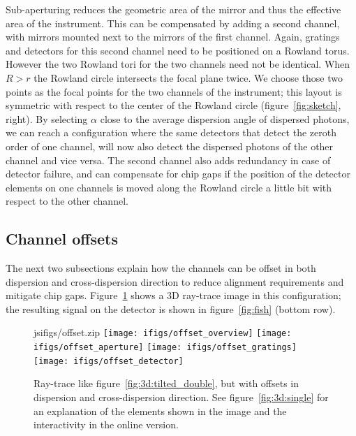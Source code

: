 \documentclass[linenumbers]{aastex631}
\begin{document}
Sub-aperturing reduces the geometric area of the mirror and thus the effective area of the instrument. This can be compensated by adding a second channel, with mirrors mounted next to the mirrors of the first channel. Again, gratings and detectors for this second channel need to be positioned on a Rowland torus. However the two Rowland tori for the two channels need not be identical. When $R> r$ the Rowland circle intersects the focal plane twice. We choose those two points as the focal points for the two channels of the instrument; this layout is symmetric with respect to the center of the Rowland circle (figure~\ref{fig:sketch}, right). By selecting $\alpha$ close to the average dispersion angle of dispersed photons, we can reach a configuration where the same detectors that detect the zeroth order of one channel, will now also detect the dispersed photons of the other channel and vice versa. The second channel also adds redundancy in case of detector failure, and can compensate for chip gaps if the position of the detector elements on one channels is moved along the Rowland circle a little bit with respect to the other channel. %

\subsection{Channel offsets}
The next two subsections explain how the channels can be offset in both dispersion and cross-dispersion direction to reduce alignment requirements and mitigate chip gaps. Figure~\ref{fig:3d:tilted_double_offset} shows a 3D ray-trace image in this configuration; the resulting signal on the detector is shown in figure~\ref{fig:fish} (bottom row).

\begin{figure}
    \begin{interactive}{js}{ifigs/offset.zip}
    \texttt{[image: ifigs/offset\_overview]}
    \texttt{[image: ifigs/offset\_aperture]}
    \texttt{[image: ifigs/offset\_gratings]}
    \texttt{[image: ifigs/offset\_detector]}
    \end{interactive}
    \caption{Ray-trace like figure~\ref{fig:3d:tilted_double}, but with offsets in dispersion and cross-dispersion direction. See figure~\ref{fig:3d:single} for an explanation of the elements shown in the image and the interactivity in the online version.
        }
    \label{fig:3d:tilted_double_offset}
\end{figure}
\end{document}
